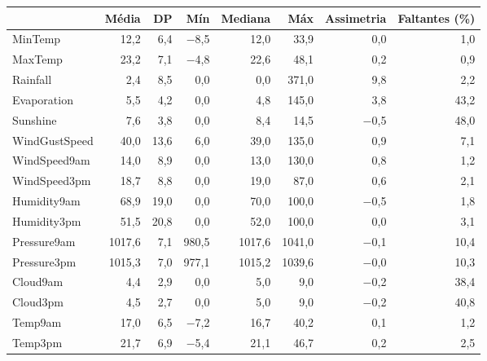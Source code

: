 \begin{tabular}{lrrrrrrr}
\toprule
 & Média & DP & Mín & Mediana & Máx & Assimetria & Faltantes (\%) \\
\midrule
MinTemp & 12,2 & 6,4 & $-$8,5 & 12,0 & 33,9 & 0,0 & 1,0 \\
MaxTemp & 23,2 & 7,1 & $-$4,8 & 22,6 & 48,1 & 0,2 & 0,9 \\
Rainfall & 2,4 & 8,5 & 0,0 & 0,0 & 371,0 & 9,8 & 2,2 \\
Evaporation & 5,5 & 4,2 & 0,0 & 4,8 & 145,0 & 3,8 & 43,2 \\
Sunshine & 7,6 & 3,8 & 0,0 & 8,4 & 14,5 & $-$0,5 & 48,0 \\
WindGustSpeed & 40,0 & 13,6 & 6,0 & 39,0 & 135,0 & 0,9 & 7,1 \\
WindSpeed9am & 14,0 & 8,9 & 0,0 & 13,0 & 130,0 & 0,8 & 1,2 \\
WindSpeed3pm & 18,7 & 8,8 & 0,0 & 19,0 & 87,0 & 0,6 & 2,1 \\
Humidity9am & 68,9 & 19,0 & 0,0 & 70,0 & 100,0 & $-$0,5 & 1,8 \\
Humidity3pm & 51,5 & 20,8 & 0,0 & 52,0 & 100,0 & 0,0 & 3,1 \\
Pressure9am & 1017,6 & 7,1 & 980,5 & 1017,6 & 1041,0 & $-$0,1 & 10,4 \\
Pressure3pm & 1015,3 & 7,0 & 977,1 & 1015,2 & 1039,6 & $-$0,0 & 10,3 \\
Cloud9am & 4,4 & 2,9 & 0,0 & 5,0 & 9,0 & $-$0,2 & 38,4 \\
Cloud3pm & 4,5 & 2,7 & 0,0 & 5,0 & 9,0 & $-$0,2 & 40,8 \\
Temp9am & 17,0 & 6,5 & $-$7,2 & 16,7 & 40,2 & 0,1 & 1,2 \\
Temp3pm & 21,7 & 6,9 & $-$5,4 & 21,1 & 46,7 & 0,2 & 2,5 \\
\bottomrule
\end{tabular}
